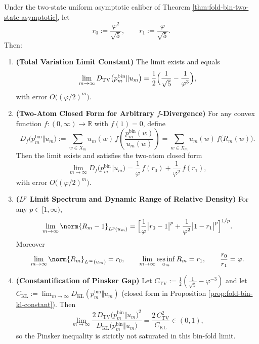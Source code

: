 \begin{theorem}\label{thm:xi-foldbin-pushforward-uniform-two-atom-ledger}
Under the two-state uniform asymptotic caliber of Theorem \ref{thm:fold-bin-two-state-asymptotic}, let
\[
r_0:=\frac{\varphi^2}{\sqrt5},\qquad r_1:=\frac{\varphi}{\sqrt5}.
\]
Then:
\begin{enumerate}
  \item \textbf{(Total Variation Limit Constant)} The limit exists and equals
  \[
  \lim_{m\to\infty}D_{\mathrm{TV}}\bigl(p^{\mathrm{bin}}_m\Vert u_m\bigr)
  =\frac12\Bigl(\frac{1}{\sqrt5}-\frac{1}{\varphi^3}\Bigr),
  \]
  with error \(O\bigl((\varphi/2)^m\bigr)\).
  \item \textbf{(Two-Atom Closed Form for Arbitrary \(f\)-Divergence)} For any convex function \(f:(0,\infty)\to\mathbb R\) with \(f(1)=0\), define
  \[
  D_f\bigl(p^{\mathrm{bin}}_m\Vert u_m\bigr)
  :=\sum_{w\in X_m}u_m(w)\,f\!\left(\frac{p^{\mathrm{bin}}_m(w)}{u_m(w)}\right)
  =\sum_{w\in X_m}u_m(w)\,f\!\bigl(R_m(w)\bigr).
  \]
  Then the limit exists and satisfies the two-atom closed form
  \[
  \lim_{m\to\infty}D_f\bigl(p^{\mathrm{bin}}_m\Vert u_m\bigr)
  =\frac{1}{\varphi}\,f(r_0)+\frac{1}{\varphi^2}\,f(r_1),
  \]
  with error \(O\bigl((\varphi/2)^m\bigr)\).
  \item \textbf{(\(L^p\) Limit Spectrum and Dynamic Range of Relative Density)} For any \(p\in[1,\infty)\),
  \[
  \lim_{m\to\infty}\norm{R_m-1}_{L^p(u_m)}
  =
  \Bigl[\frac{1}{\varphi}\bigl|r_0-1\bigr|^p+\frac{1}{\varphi^2}\bigl|1-r_1\bigr|^p\Bigr]^{1/p}.
  \]
  Moreover
  \[
  \lim_{m\to\infty}\norm{R_m}_{L^\infty(u_m)}=r_0,\qquad
  \lim_{m\to\infty}\operatorname*{ess\,inf}_{u_m}R_m=r_1,
  \qquad
  \frac{r_0}{r_1}=\varphi.
  \]
  \item \textbf{(Constantification of Pinsker Gap)} Let
  \(
  C_{\mathrm{TV}}:=\frac12(\frac{1}{\sqrt5}-\varphi^{-3})
  \)
  and let
  \(
  C_{\mathrm{KL}}:=\lim_{m\to\infty}D_{\mathrm{KL}}(p^{\mathrm{bin}}_m\Vert u_m)
  \)
  (closed form in Proposition \ref{prop:fold-bin-kl-constant}).
  Then
  \[
  \lim_{m\to\infty}\frac{2\,D_{\mathrm{TV}}\bigl(p^{\mathrm{bin}}_m\Vert u_m\bigr)^2}{D_{\mathrm{KL}}\bigl(p^{\mathrm{bin}}_m\Vert u_m\bigr)}
  =\frac{2\,C_{\mathrm{TV}}^2}{C_{\mathrm{KL}}}\in(0,1),
  \]
  so the Pinsker inequality is strictly not saturated in this bin-fold limit.
\end{enumerate}
\end{theorem}

